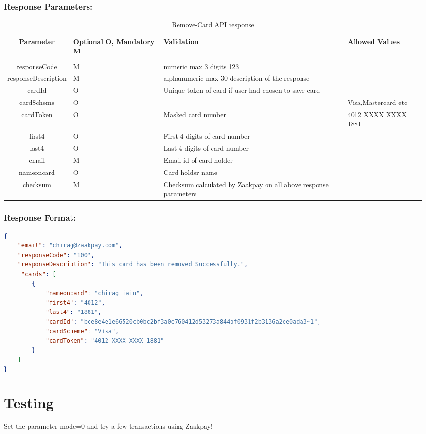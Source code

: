\documentclass{article}
\begin{document}
\subsubsection{Response Parameters:}
\begin{longtable}{||c| p{2.09cm} || p{5.5cm}| p{4.7cm}||}
\caption{Remove-Card API response}\\
\rowcolor{green!50}
    \bfseries{Parameter} & \bfseries{Optional O, Mandatory M} & \bfseries{Validation} & \bfseries{Allowed Values} \\ \hline
&&&\\
responseCode  & M& numeric max 3 digits 123& \\
responseDescription  & M& alphanumeric   max   30   description   of   the  response&  \\
cardId  & O& Unique token of card if user had chosen to save card&  \\
cardScheme   &O& & Visa,Mastercard etc  \\
cardToken  &O &Masked card number & 4012   XXXX   XXXX  1881  \\
first4  &O &First 4 digits of card number  & \\
last4 &O &Last 4 digits of card number  & \\
email & M &Email id of card holder  & \\
nameoncard  & O& Card holder name& \\
checksum &M& Checksum calculated by Zaakpay on all above response parameters&  \\
\end{longtable}
\subsubsection{Response Format:}
\begin{lstlisting}[language=json,breaklines=true]
{ 
    "email": "chirag@zaakpay.com", 
    "responseCode": "100", 
    "responseDescription": "This card has been removed Successfully.", 
     "cards": [ 
        { 
            "nameoncard": "chirag jain", 
            "first4": "4012", 
            "last4": "1881", 
            "cardId": "bce8e4e1e66520cb0bc2bf3a0e760412d53273a844bf0931f2b3136a2ee0ada3~1", 
            "cardScheme": "Visa", 
            "cardToken": "4012 XXXX XXXX 1881" 
        } 
    ] 
}  
\end{lstlisting}
\newpage

\section{Testing}
Set the parameter mode=0 and try a few transactions using Zaakpay! \\
\end{document}
